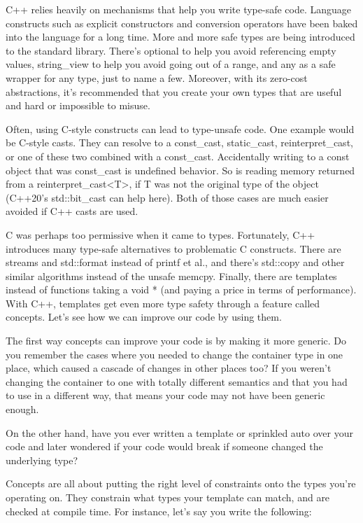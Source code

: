 
C++ relies heavily on mechanisms that help you write type-safe code. Language constructs such as explicit constructors and conversion operators have been baked into the language for a long time. More and more safe types are being introduced to the standard library. There's optional to help you avoid referencing empty values, string\_view to help you avoid going out of a range, and any as a safe wrapper for any type, just to name a few. Moreover, with its zero-cost abstractions, it's recommended that you create your own types that are useful and hard or impossible to misuse.

Often, using C-style constructs can lead to type-unsafe code. One example would be C-style casts. They can resolve to a const\_cast, static\_cast, reinterpret\_cast, or one of these two combined with a const\_cast. Accidentally writing to a const object that was const\_cast is undefined behavior. So is reading memory returned from a reinterpret\_cast<T>, if T was not the original type of the object (C++20's std::bit\_cast can help here). Both of those cases are much easier avoided if C++ casts are used.

C was perhaps too permissive when it came to types. Fortunately, C++ introduces many type-safe alternatives to problematic C constructs. There are streams and std::format instead of printf et al., and there's std::copy and other similar algorithms instead of the unsafe memcpy. Finally, there are templates instead of functions taking a void * (and paying a price in terms of performance). With C++, templates get even more type safety through a feature called concepts. Let's see how we can improve our code by using them.


The first way concepts can improve your code is by making it more generic. Do you remember the cases where you needed to change the container type in one place, which caused a cascade of changes in other places too? If you weren't changing the container to one with totally different semantics and that you had to use in a different way, that means your code may not have been generic enough. 

On the other hand, have you ever written a template or sprinkled auto over your code and later wondered if your code would break if someone changed the underlying type?

Concepts are all about putting the right level of constraints onto the types you're operating on. They constrain what types your template can match, and are checked at compile time. For instance, let's say you write the following:

